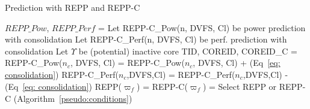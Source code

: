 \begin{algorithm}[h!]
    \caption{Prediction with REPP and REPP-C}
    \label{pseudo:models}
    \begin{algorithmic}[1]
        \State $REPP\_Pow$, $REPP\_Perf$ = 
        \State Let REPP-C\_Pow(n, DVFS, Cl) be power prediction with consolidation
        \State Let REPP-C\_Perf(n, DVFS, Cl) be perf. prediction with consolidation
        \State Let $\Upsilon$ be (potential) inactive core 
        \State TID, COREID, COREID\_C =   
                    \State REPP-C\_Pow($n_{c}$, DVFS, Cl)  = REPP-C\_Pow($n_{c}$, DVFS, Cl)  + (Eq~\ref{eq: consolidation})
                    \State REPP-C\_Perf($n_{c}$,DVFS,Cl) = REPP-C\_Perf($n_{c}$,DVFS,Cl) - (Eq~\ref{eq: consolidation})
                  \EndFor 
              \EndFor
          \EndFor
        \State REPP($\varpi_{\mathit{f}}$) =  
        \State REPP-C($\varpi_{\mathit{f}}$) =  
        \State Select REPP or REPP-C (Algorithm~\ref{pseudo:conditions})
    \end{algorithmic}
\end{algorithm}


